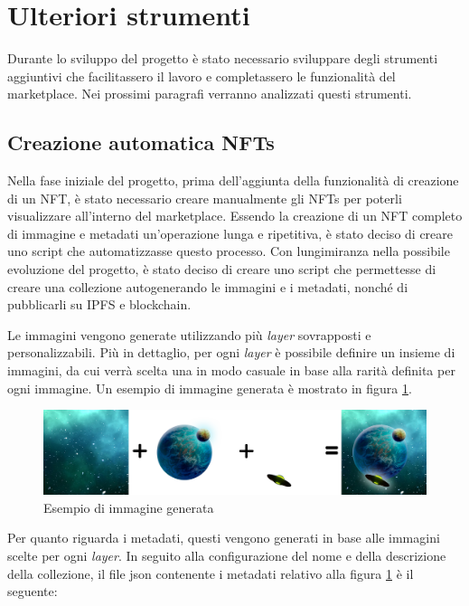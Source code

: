 \section{Ulteriori strumenti}

Durante lo sviluppo del progetto è stato necessario sviluppare degli strumenti aggiuntivi che facilitassero il lavoro e completassero le funzionalità del marketplace. Nei prossimi paragrafi verranno analizzati questi strumenti.

\subsection{Creazione automatica NFTs}

Nella fase iniziale del progetto, prima dell'aggiunta della funzionalità di creazione di un NFT, è stato necessario creare manualmente gli NFTs per poterli visualizzare all'interno del marketplace. Essendo la creazione di un NFT completo di immagine e metadati un'operazione lunga e ripetitiva, è stato deciso di creare uno script che automatizzasse questo processo. Con lungimiranza nella possibile evoluzione del progetto, è stato deciso di creare uno script che permettesse di creare una collezione autogenerando le immagini e i metadati, nonché di pubblicarli su IPFS e blockchain.

Le immagini vengono generate utilizzando più \textit{layer} sovrapposti e personalizzabili. Più in dettaglio, per ogni \textit{layer} è possibile definire un insieme di immagini, da cui verrà scelta una in modo casuale in base alla rarità definita per ogni immagine. Un esempio di immagine generata è mostrato in figura \ref{fig:esempio-immagine-generata}.

\begin{figure}[H]
    \centering
    \includegraphics[width=1\textwidth]{images/NFTAutogenerato.png}
    \caption{Esempio di immagine generata}
    \label{fig:esempio-immagine-generata}
\end{figure}


Per quanto riguarda i metadati, questi vengono generati in base alle immagini scelte per ogni \textit{layer}. In seguito alla configurazione del nome e della descrizione della collezione, il file json contenente i metadati relativo alla figura \ref{fig:esempio-immagine-generata} è il seguente:

